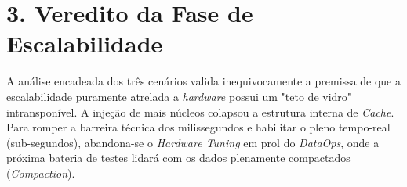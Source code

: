 \documentclass[12pt, a4paper]{article}
\begin{document}
\section*{3. Veredito da Fase de Escalabilidade}
A análise encadeada dos três cenários valida inequivocamente a premissa de que a escalabilidade puramente atrelada a \textit{hardware} possui um "teto de vidro" intransponível. A injeção de mais núcleos colapsou a estrutura interna de \textit{Cache}. Para romper a barreira técnica dos milissegundos e habilitar o pleno tempo-real (sub-segundos), abandona-se o \textit{Hardware Tuning} em prol do \textit{DataOps}, onde a próxima bateria de testes lidará com os dados plenamente compactados (\textit{Compaction}).
\end{document}
